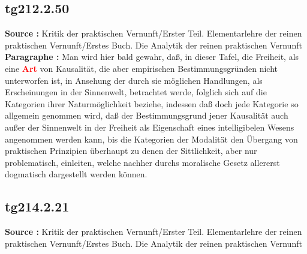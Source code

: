 \documentclass[a4paper,12pt,twoside]{book}
\newcommand{\match}[1]{\textcolor{red}{\textbf{#1}}}
\begin{document}
	\subsection*{tg212.2.50} 
	\textbf{Source : }Kritik der praktischen Vernunft/Erster Teil. Elementarlehre der reinen praktischen Vernunft/Erstes Buch. Die Analytik der reinen praktischen Vernunft\\  
	
	\noindent\textbf{Paragraphe : }Man wird hier bald gewahr, daß, in dieser Tafel, die Freiheit, als eine \match{Art} von Kausalität, die aber empirischen Bestimmungsgründen nicht unterworfen ist, in Ansehung der durch sie möglichen Handlungen, als Erscheinungen in der Sinnenwelt, betrachtet werde, folglich sich auf die Kategorien ihrer Naturmöglichkeit beziehe, indessen daß doch jede Kategorie so allgemein genommen wird, daß der Bestimmungsgrund jener Kausalität auch außer der Sinnenwelt in der Freiheit als Eigenschaft eines intelligibelen Wesens angenommen werden kann, bis die Kategorien der Modalität den Übergang von praktischen Prinzipien überhaupt zu denen der Sittlichkeit, aber nur problematisch, einleiten, welche nachher durchs moralische Gesetz allererst dogmatisch dargestellt werden können. 
	
	\subsection*{tg214.2.21} 
	\textbf{Source : }Kritik der praktischen Vernunft/Erster Teil. Elementarlehre der reinen praktischen Vernunft/Erstes Buch. Die Analytik der reinen praktischen Vernunft\\  
	
\end{document}
